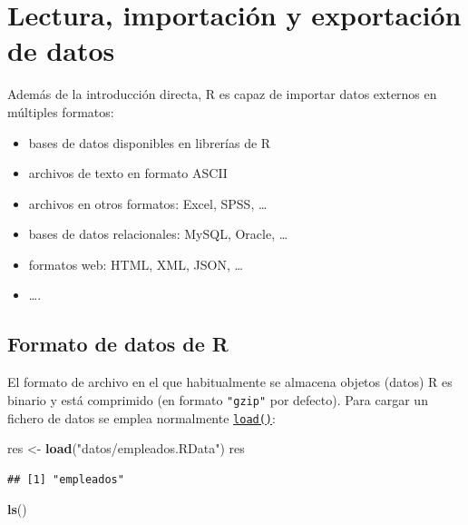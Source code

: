 \documentclass[]{book}
\newenvironment{Shaded}{\begin{snugshade}}{\end{snugshade}}
\newcommand{\KeywordTok}[1]{\textcolor[rgb]{0.13,0.29,0.53}{\textbf{#1}}}
\newcommand{\NormalTok}[1]{#1}
\newcommand{\StringTok}[1]{\textcolor[rgb]{0.31,0.60,0.02}{#1}}
\begin{document}
\hypertarget{lectura-importacion-y-exportacion-de-datos}{%
\section{Lectura, importación y exportación de datos}\label{lectura-importacion-y-exportacion-de-datos}}

Además de la introducción directa, R es capaz de
importar datos externos en múltiples formatos:

\begin{itemize}
\item
  bases de datos disponibles en librerías de R
\item
  archivos de texto en formato ASCII
\item
  archivos en otros formatos: Excel, SPSS, \ldots{}
\item
  bases de datos relacionales: MySQL, Oracle, \ldots{}
\item
  formatos web: HTML, XML, JSON, \ldots{}
\item
  \ldots{}.
\end{itemize}

\hypertarget{formato-de-datos-de-r}{%
\subsection{Formato de datos de R}\label{formato-de-datos-de-r}}

El formato de archivo en el que habitualmente se almacena objetos (datos)
R es binario y está comprimido (en formato \texttt{"gzip"} por defecto).
Para cargar un fichero de datos se emplea normalmente \href{https://www.rdocumentation.org/packages/base/versions/3.6.1/topics/load}{\texttt{load()}}:

\begin{Shaded}
\begin{Highlighting}[]
\NormalTok{res <-}\StringTok{ }\KeywordTok{load}\NormalTok{(}\StringTok{"datos/empleados.RData"}\NormalTok{)}
\NormalTok{res}
\end{Highlighting}
\end{Shaded}

\begin{verbatim}
## [1] "empleados"
\end{verbatim}

\begin{Shaded}
\begin{Highlighting}[]
\KeywordTok{ls}\NormalTok{()}
\end{Highlighting}
\end{Shaded}
\end{document}
